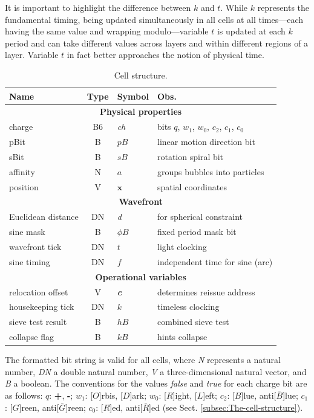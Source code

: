 \documentclass[12pt,english]{article}
\begin{document}
It is important to highlight the difference between $k$ and $t$. While $k$ represents the fundamental timing, being updated simultaneously in all cells at all times—each having the same value and wrapping modulo—variable $t$ is updated at each $k$ period and can take different values across layers and within different regions of a layer. Variable $t$ in fact better approaches the notion of physical time.

\begin{table}
\begin{centering}
\begin{tabular}{|l|c|l|l|}
\hline 
\textbf{\large{}Name} & \textbf{\large{}Type} & \textbf{\large{}Symbol} & \textbf{\large{}Obs.}\tabularnewline
\hline 
\hline 
\multicolumn{4}{|c|}{\textbf{Physical properties}}\tabularnewline
\hline 
charge & B6 & \emph{ch} & bits $q$, $w_{1}$, $w_{0}$, $c_{2}$, $c_{1}$, $c_{0}$\tabularnewline
\hline 
pBit & B & $pB$ & linear motion direction bit\tabularnewline
\hline 
sBit & B & $sB$ & rotation spiral bit\tabularnewline
\hline 
affinity & N & $a$ & groups bubbles into particles\tabularnewline
\hline 
position & V & $\boldsymbol{x}$ & spatial coordinates\tabularnewline
\hline 
\multicolumn{4}{|c|}{\textbf{Wavefront}}\tabularnewline
\hline 
Euclidean distance & DN & \emph{d} & for spherical constraint\tabularnewline
\hline 
sine mask & B & $\phi B$ & fixed period mask bit\tabularnewline
\hline 
wavefront tick & DN & $t$ & light clocking\tabularnewline
\hline 
sine timing & DN & $f$ & independent time for sine (arc)\tabularnewline
\hline 
\multicolumn{4}{|c|}{\textbf{Operational variables}}\tabularnewline
\hline 
relocation offset & V & \textbf{\emph{c}} & determines reissue address\tabularnewline
\hline 
housekeeping tick & DN & $k$ & timeless clocking\tabularnewline
\hline 
sieve test result & B & $hB$ & combined sieve test\tabularnewline
\hline 
collapse flag & B & $kB$ & hints collapse\tabularnewline
\hline 
\end{tabular}
\par\end{centering}

\caption{Cell structure.}

{\small{}The formatted bit string is valid for all cells, where }\emph{\small{}N}{\small{}
represents a natural number, }\emph{\small{}DN}{\small{} 
a double natural number, }\emph{\small{}V}{\small{} a three-dimensional natural vector, and }\emph{\small{}B}{\small{} 
a boolean. The conventions for the values }\emph{\small{}false}{\small{} and }\emph{\small{}true}{\small{} for each 
charge bit are as follows: $q$: }\textbf{\small{}+}{\small{}, }\textbf{\small{}-}{\small{}; $w_{1}$: {[}$O${]}rbis, {[}$D${]}ark; 
$w_{0}$: {[}$R${]}ight, {[}$L${]}eft; $c_{2}$: {[}$B${]}lue, anti{[}$\bar{B}${]}lue; $c_{1}$: {[}$G${]}reen, anti{[}$\bar{G}${]}reen; 
$c_{0}$: {[}$R${]}ed, anti{[}$\bar{R}${]}ed (see Sect. \ref{subsec:The-cell-structure}).}\label{tab:Cell-structure}
\end{table}
\end{document}
